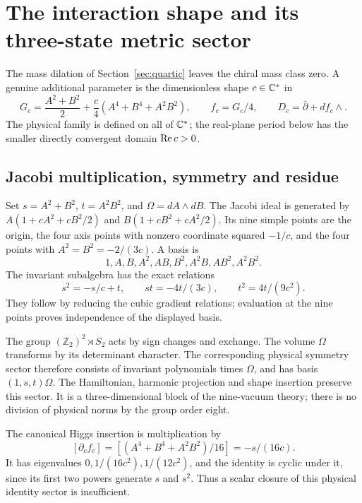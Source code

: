 \section{The interaction shape and its three-state metric sector}
\label{sec:shape}
The mass dilation of Section~\ref{sec:quartic} leaves the chiral mass
class zero. A genuine additional parameter is the dimensionless shape
$c\in\mathbb C^*$ in
\begin{equation}\label{shape:potential}
G_c=\frac{A^2+B^2}{2}+\frac c4(A^4+B^4+A^2B^2),
\qquad f_c=G_c/4,\qquad D_c=\bar\partial+df_c\wedge .
\end{equation}
The physical family is defined on all of $\mathbb C^*$; the real-plane period
below has the smaller directly convergent domain $\operatorname{Re} c>0$.

\subsection{Jacobi multiplication, symmetry and residue}
Set $s=A^2+B^2$, $t=A^2B^2$, and $\Omega=dA\wedge dB$. The Jacobi
ideal is generated by
$A(1+cA^2+cB^2/2)$ and $B(1+cB^2+cA^2/2)$. Its nine simple points
are the origin, the four axis points with nonzero coordinate squared
$-1/c$, and the four points with $A^2=B^2=-2/(3c)$. A basis is
\[
1,A,B,A^2,AB,B^2,A^2B,AB^2,A^2B^2.
\]
The invariant subalgebra has the exact relations
\begin{equation}\label{shape:algebra}
s^2=-s/c+t,\qquad st=-4t/(3c),\qquad t^2=4t/(9c^2).
\end{equation}
They follow by reducing the cubic gradient relations; evaluation at
the nine points proves independence of the displayed basis.

The group $(\mathbb Z_2)^2\rtimes S_2$ acts by sign changes and exchange.
The volume $\Omega$ transforms by its determinant character. The
corresponding physical symmetry sector therefore consists of invariant
polynomials times $\Omega$, and has basis $(1,s,t)\Omega$. The
Hamiltonian, harmonic projection and shape insertion preserve this
sector. It is a three-dimensional block of the nine-vacuum theory;
there is no division of physical norms by the group order eight.

The canonical Higgs insertion is multiplication by
\begin{equation}\label{shape:higgs}
[\partial_cf_c]=[ (A^4+B^4+A^2B^2)/16]=-s/(16c).
\end{equation}
It has eigenvalues $0,1/(16c^2),1/(12c^2)$, and the identity is
cyclic under it, since its first two powers generate $s$ and $s^2$.
Thus a scalar closure of this physical identity sector is insufficient.

